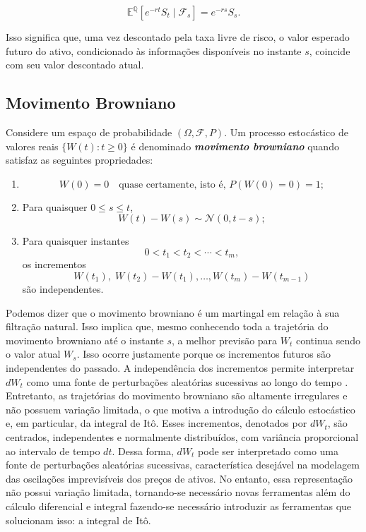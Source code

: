 \begin{equation}
\mathbb{E}^{\mathbb{Q}}
\left[
e^{-rt}S_t
\mid
\mathcal{F}_s
\right]
=
e^{-rs}S_s.
\end{equation}

Isso significa que, uma vez descontado pela taxa livre de risco, o valor
esperado futuro do ativo, condicionado às informações disponíveis no
instante $s$, coincide com seu valor descontado atual.

\subsection{Movimento Browniano}
Considere um espaço de probabilidade $(\Omega,\mathcal{F},P)$.
Um processo estocástico de valores reais
$\{W(t):t\geq 0\}$ é denominado \textbf{\textit{movimento browniano}}
quando satisfaz as seguintes propriedades:

\begin{enumerate}
    \item
   \begin{equation}
W(0)=0 \quad \text{quase certamente, isto é, } P(W(0)=0)=1;
\end{equation}
    \item Para quaisquer $0\leq s\leq t$,
    \begin{equation}
W(t)-W(s)\sim\mathcal{N}(0,t-s);
\end{equation}
    \item Para quaisquer instantes
    \begin{equation}
0<t_1<t_2<\cdots<t_m,
\end{equation}
    os incrementos
    \begin{equation}
W(t_1),\;
    W(t_2)-W(t_1),\ldots,
    W(t_m)-W(t_{m-1})
\end{equation}
    são independentes.
\end{enumerate}
Podemos dizer que o movimento browniano é um martingal em relação à sua
filtração natural. Isso implica que, mesmo conhecendo toda a trajetória
do movimento browniano até o instante $s$, a melhor previsão para $W_t$
continua sendo o valor atual $W_s$. \cite{albani2025} Isso ocorre justamente porque os incrementos futuros são independentes do passado. A independência dos incrementos permite interpretar $dW_t$ como uma fonte
de perturbações aleatórias sucessivas ao longo do tempo
\cite{fouque2011blackscholes}. Entretanto, as trajetórias do movimento
browniano são altamente irregulares e não possuem variação limitada, o que
motiva a introdução do cálculo estocástico e, em particular, da integral
de Itô. Esses incrementos, denotados por $dW_t$, são centrados,
independentes e normalmente distribuídos, com variância proporcional ao
intervalo de tempo $dt$. Dessa forma, $dW_t$ pode ser interpretado como uma
fonte de perturbações aleatórias sucessivas, característica desejável na
modelagem das oscilações imprevisíveis dos preços de ativos. No entanto, essa representação não possui variação limitada, tornando-se necessário novas ferramentas além do cálculo diferencial e integral fazendo-se necessário introduzir as ferramentas que solucionam isso: a integral de Itô.

